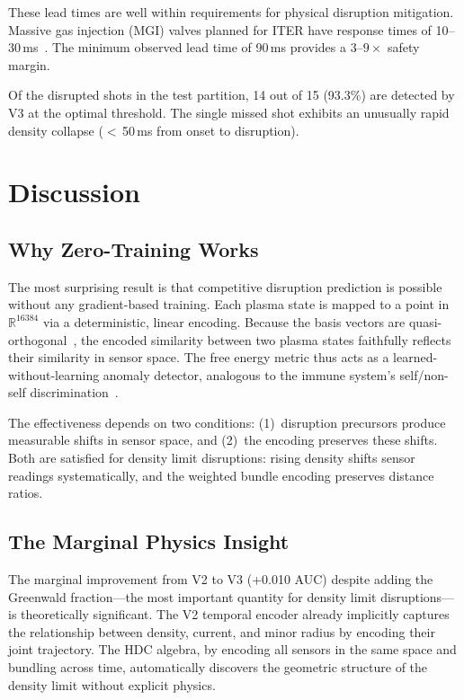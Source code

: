 \documentclass[twocolumn,prl,aps,superscriptaddress,floatfix]{revtex4-2}
\begin{document}
These lead times are well within requirements for physical disruption mitigation. Massive gas injection (MGI) valves planned for ITER have response times of 10--30\,ms~\cite{Lehnen2015}. The minimum observed lead time of 90\,ms provides a $3$--$9\times$ safety margin.

Of the disrupted shots in the test partition, 14 out of 15 (93.3\%) are detected by V3 at the optimal threshold. The single missed shot exhibits an unusually rapid density collapse ($<$\,50\,ms from onset to disruption).

\section{Discussion}
\label{sec:discussion}

\subsection{Why Zero-Training Works}

The most surprising result is that competitive disruption prediction is possible without any gradient-based training. Each plasma state is mapped to a point in $\mathbb{R}^{16384}$ via a deterministic, linear encoding. Because the basis vectors are quasi-orthogonal~\cite{Kanerva2009,Plate2003}, the encoded similarity between two plasma states faithfully reflects their similarity in sensor space. The free energy metric thus acts as a learned-without-learning anomaly detector, analogous to the immune system's self/non-self discrimination~\cite{Friston2010}.

The effectiveness depends on two conditions: (1)~disruption precursors produce measurable shifts in sensor space, and (2)~the encoding preserves these shifts. Both are satisfied for density limit disruptions: rising density shifts sensor readings systematically, and the weighted bundle encoding preserves distance ratios.

\subsection{The Marginal Physics Insight}

The marginal improvement from V2 to V3 (+0.010 AUC) despite adding the Greenwald fraction---the most important quantity for density limit disruptions---is theoretically significant. The V2 temporal encoder already implicitly captures the relationship between density, current, and minor radius by encoding their joint trajectory. The HDC algebra, by encoding all sensors in the same space and bundling across time, automatically discovers the geometric structure of the density limit without explicit physics.
\end{document}
